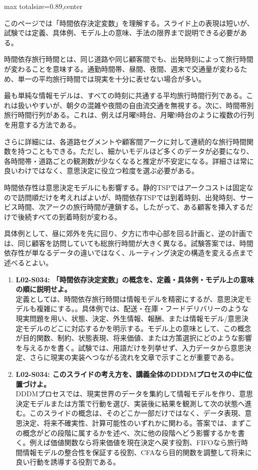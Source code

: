 \begin{minipage}[t]{0.58\textwidth}
\begin{adjustbox}{max totalsize={\textwidth}{0.89\textheight},center}
\begin{minipage}{\textwidth}\scriptsize
{}このページでは「時間依存決定変数」を理解する。スライド上の表現は短いが、試験では定義、具体例、モデル上の意味、手法の限界まで説明できる必要がある。\par
時間依存旅行時間とは、同じ道路や同じ顧客間でも、出発時刻によって旅行時間が変わることを意味する。通勤時間帯、昼間、夜間、週末で交通量が変わるため、単一の平均旅行時間では現実を十分に表せない場合が多い。\par
最も単純な情報モデルは、すべての時刻に共通する平均旅行時間行列である。これは扱いやすいが、朝夕の混雑や夜間の自由流交通を無視する。次に、時間帯別旅行時間行列がある。これは、例えば月曜8時台、月曜9時台のように複数の行列を用意する方法である。\par
さらに詳細には、各道路セグメントや顧客間アークに対して連続的な旅行時間関数を持つこともできる。ただし、細かいモデルほど多くのデータが必要になり、各時間帯・道路ごとの観測数が少なくなると推定が不安定になる。詳細さは常に良いわけではなく、意思決定に役立つ粒度を選ぶ必要がある。\par
時間依存性は意思決定モデルにも影響する。静的TSPではアークコストは固定なので訪問順だけを考えればよいが、時間依存TSPでは到着時刻、出発時刻、サービス時間、次アークの旅行時間が連鎖する。したがって、ある顧客を挿入するだけで後続すべての到着時刻が変わる。\par
具体例として、昼に郊外を先に回り、夕方に市中心部を回る計画と、逆の計画では、同じ顧客を訪問していても総旅行時間が大きく異なる。試験答案では、時間依存性が単なるデータの違いではなく、ルーティング決定の構造を変える点まで述べるとよい。\par{}\begin{enumerate}\item \textbf{L02-S034: 「時間依存決定変数」の概念を、定義・具体例・モデル上の意味の順に説明せよ。}\\定義としては、時間依存旅行時間は情報モデルを精密にするが、意思決定モデルも複雑にする。。具体例では、配送・在庫・フードデリバリーのような現実問題を用い、状態、決定、外生情報、報酬、または情報モデル/意思決定モデルのどこに対応するかを明示する。モデル上の意味として、この概念が目的関数、制約、状態表現、将来価値、または方策選択にどのような影響を与えるかを書く。試験では、用語だけを列挙せず、入力データから意思決定、さらに現実の実装へつながる流れを文章で示すことが重要である。\item \textbf{L02-S034: このスライドの考え方を、講義全体のDDDMプロセスの中に位置づけよ。}\\DDDMプロセスでは、現実世界のデータを集約して情報モデルを作り、意思決定モデルまたは方策で行動を選び、実装後に結果を観測して次の状態へ進む。このスライドの概念は、そのどこか一部だけではなく、データ表現、意思決定、将来不確実性、計算可能性のいずれかに関わる。答案では、まずこの概念がどの段階に属するかを述べ、次に他の段階へどう影響するかを書く。例えば価値関数なら将来価値を現在決定へ戻す役割、FIFOなら旅行時間情報モデルの整合性を保証する役割、CFAなら目的関数を調整して将来に良い行動を誘導する役割である。\end{enumerate}

\end{minipage}
\end{adjustbox}
\end{minipage}
